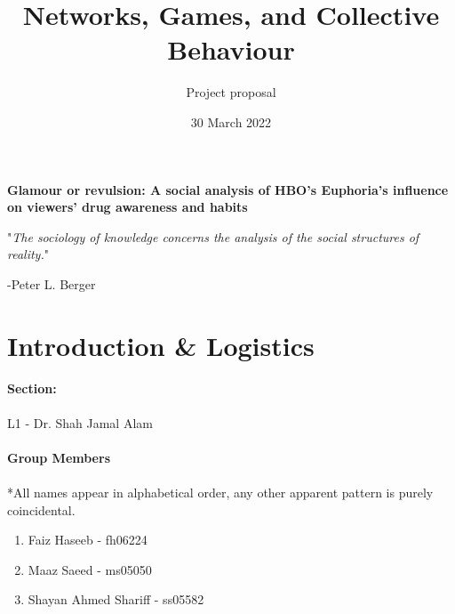 \documentclass[answers]{exam}
\title{Networks, Games, and Collective Behaviour}
\author{Project proposal}
\date{30 March 2022}
\begin{document}
\maketitle
\paragraph{}
\paragraph{}
\paragraph{}
\paragraph{}
\paragraph{}
\paragraph{}
\begin{center}
    \textbf{Glamour or revulsion: A social analysis of HBO's Euphoria's influence on viewers' drug awareness and habits}
\end{center}
\newpage
\tableofcontents

\newpage
\pagebreak
\hspace{0pt}
\vfill
\begin{center}
    "\textit{The sociology of knowledge concerns the analysis of the social structures of reality.}"
\end{center}
\flushright
-Peter L. Berger
\vfill
\hspace{0pt}
\flushleft
\pagebreak

\section{Introduction \& Logistics}

\paragraph{Section:} L1 - Dr. Shah Jamal Alam
\paragraph{Group Members}
\paragraph{}
*All names appear in alphabetical order, any other apparent pattern is purely coincidental.
\begin{enumerate}
    \item Faiz Haseeb - fh06224
    \item Maaz Saeed - ms05050
    \item Shayan Ahmed Shariff - ss05582
\end{enumerate}
\end{document}
